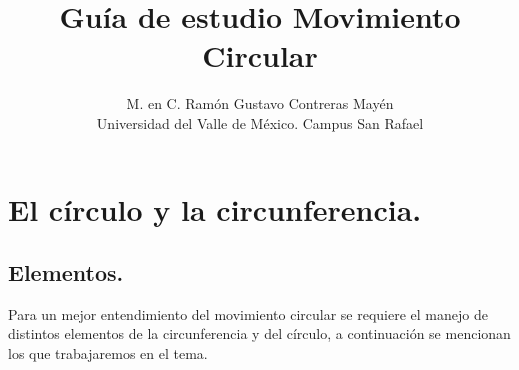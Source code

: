 \documentclass[12pt]{article}
\title{\vspace*{-2cm} Guía de estudio Movimiento Circular}
\author{M. en C. Ramón Gustavo Contreras Mayén \\ {\fontsize{14}{14}\selectfont Universidad del Valle de México. Campus San Rafael}}
\date{}
\begin{document}
\maketitle

\section{El círculo y la circunferencia.}
\subsection{Elementos.}

Para un mejor entendimiento del movimiento circular se requiere el manejo de distintos elementos de la circunferencia y del círculo, a continuación se mencionan los que trabajaremos en el tema.
\end{document}
